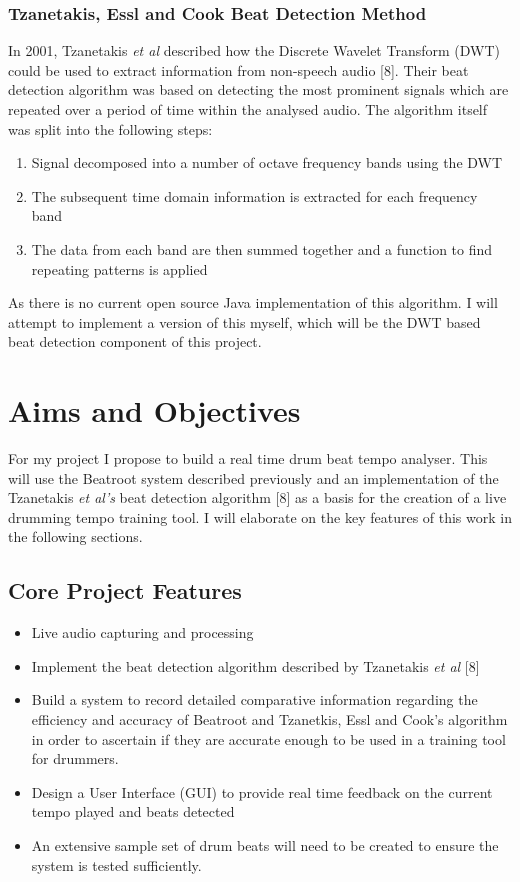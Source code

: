\documentclass[a4paper, 11pt]{article}
\begin{document}
\subsubsection{Tzanetakis, Essl and Cook Beat Detection Method}
In 2001, Tzanetakis \textit{et al} described how the Discrete Wavelet Transform (DWT) could be used to extract information from non-speech audio [8]. Their beat detection algorithm was based on detecting the most prominent signals which are repeated over a period of time within the analysed audio. The algorithm itself was split into the following steps: 

\begin{enumerate}
\item Signal decomposed into a number of octave frequency bands using the DWT
\item The subsequent time domain information is extracted for each frequency band
\item The data from each band are then summed together and a function to find repeating patterns is applied
\end{enumerate}

As there is no current open source Java implementation of this algorithm. I will attempt to implement a version of this myself, which will be the DWT based beat detection component of this project.


\maketitle{}
\section{Aims and Objectives}
For my project I propose to build a real time drum beat tempo analyser. This will use the Beatroot system described previously and an implementation of the Tzanetakis \textit{et al's} beat detection algorithm [8] as a basis for the creation of a live drumming tempo training tool. I will elaborate on the key features of this work in the following sections.


\subsection{Core Project Features}
\begin{itemize}
\item Live audio capturing and processing
\item Implement the beat detection algorithm described by Tzanetakis \textit{et al}  [8] 
\item Build a system to record detailed comparative information regarding the efficiency and accuracy of Beatroot and Tzanetkis, Essl and Cook's algorithm in order to ascertain if they are accurate enough to be used in a training tool for drummers.
\item Design a User Interface (GUI) to provide real time feedback on the current tempo played and beats detected
\item An extensive sample set of drum beats will need to be created to ensure the system is tested sufficiently.
\end{itemize}
\end{document}
